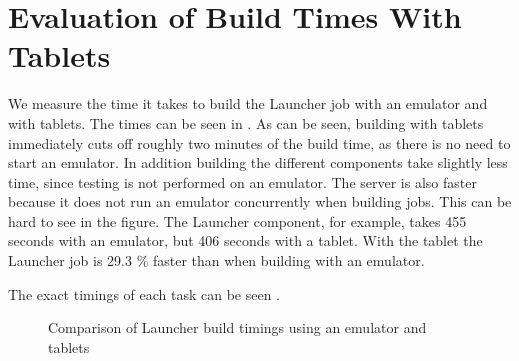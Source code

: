 \section{Evaluation of Build Times With Tablets}
We measure the time it takes to build the Launcher job with an emulator and with tablets. The times can be seen in . As can be seen, building with tablets immediately cuts off roughly two minutes of the build time, as there is no need to start an emulator. In addition building the different components take slightly less time, since testing is not performed on an emulator. The server is also faster because it does not run an emulator concurrently when building jobs. This can be hard to see in the figure. The Launcher component, for example, takes 455 seconds with an emulator, but 406 seconds with a tablet. With the tablet the Launcher job is 29.3 \% faster than when building with an emulator.

The exact timings of each task can be seen .

\begin{figure}
\centering
{}
\caption{Comparison of Launcher build timings using an emulator and tablets}\label{fig:launcher_build_times_3}
\end{figure}